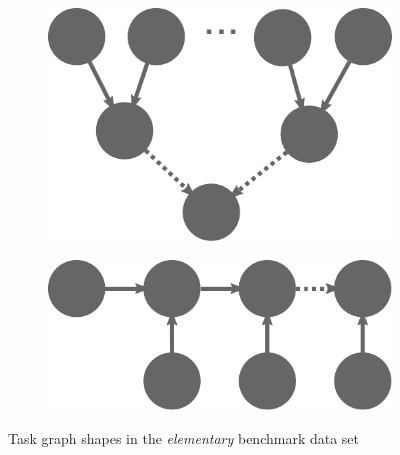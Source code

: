 \begin{figure}[h]
\begin{subfigure}{.2\textwidth}
		\caption{}
		\label{fig:tg-splitters}
	\end{subfigure}
	\begin{subfigure}{.2\textwidth}
		\centering
		\includegraphics[width=.8\linewidth]{imgs/estee/shapes/conflux}
		\caption{}
		\label{fig:tg-conflux}
	\end{subfigure}
	\begin{subfigure}{.2\textwidth}
		\centering
		\includegraphics[width=.8\linewidth]{imgs/estee/shapes/fern}
		\caption{}
		\label{fig:tg-fern}
	\end{subfigure}

	\caption{Task graph shapes in the \emph{elementary} \estee{} benchmark data set}
	\label{fig:estee-elementary-shapes}
\end{figure}

